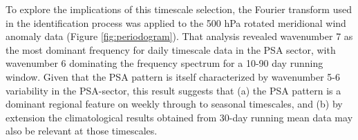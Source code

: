 To explore the implications of this timescale selection, the Fourier transform used in the identification process was applied to the 500 hPa rotated meridional wind anomaly data (Figure \ref{fig:periodogram}). That analysis revealed wavenumber 7 as the most dominant frequency for daily timescale data in the PSA sector, with wavenumber 6 dominating the frequency spectrum for a 10-90 day running window. Given that the PSA pattern is itself characterized by wavenumber 5-6 variability in the PSA-sector, this result suggests that (a) the PSA pattern is a dominant regional feature on weekly through to seasonal timescales, and (b) by extension the climatological results obtained from 30-day running mean data may also be relevant at those timescales.


